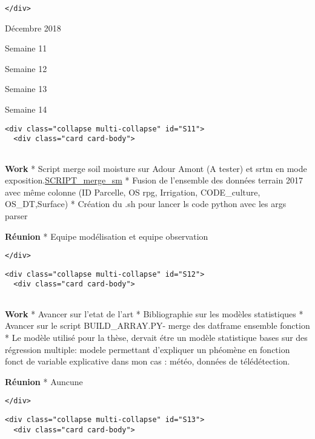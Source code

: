 \documentclass[11pt]{article}
\begin{document}
\begin{verbatim}
</div>
\end{verbatim}

    Décembre 2018

\hypertarget{DEC2017}{}
Semaine 11

Semaine 12

Semaine 13

Semaine 14

\begin{verbatim}
<div class="collapse multi-collapse" id="S11">
  <div class="card card-body">
    
\end{verbatim}

\textbf{Work} * Script merge soil moisture sur Adour Amont (A tester) et
srtm en mode
exposition.\href{https://github.com/pageotyann/Code/blob/master/SCRIPT/python/MERGE_SM.py}{SCRIPT\_merge\_sm}
* Fusion de l'ensemble des données terrain 2017 avec même colonne (ID
Parcelle, OS rpg, Irrigation, CODE\_culture, OS\_DT,Surface) * Création
du .sh pour lancer ls code python avec les args parser

\textbf{Réunion} * Equipe modélisation et equipe observation

\begin{verbatim}
</div>
\end{verbatim}

\begin{verbatim}
<div class="collapse multi-collapse" id="S12">
  <div class="card card-body">
      
\end{verbatim}

\textbf{Work} * Avancer sur l'etat de l'art * Bibliographie sur les
modèles statistiques * Avancer sur le script BUILD\_ARRAY.PY- merge des
datframe ensemble fonction * Le modèle utilisé pour la thèse, dervait
étre un modèle statistique bases sur des régression multiple: modele
permettant d'expliquer un phéomène en fonction fonct de variable
explicative dans mon cas : météo, données de télédétection.

\textbf{Réunion} * Auncune

\begin{verbatim}
</div>
\end{verbatim}

\begin{verbatim}
<div class="collapse multi-collapse" id="S13">
  <div class="card card-body">
      
\end{verbatim}
\end{document}
